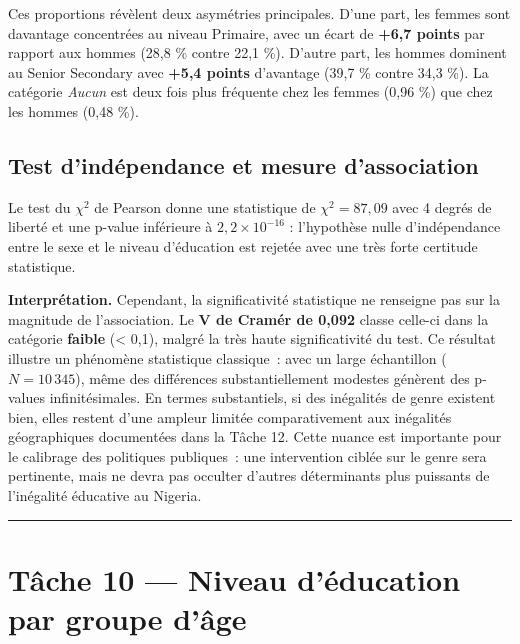\documentclass[
]{article}
\begin{document}
Ces proportions révèlent deux asymétries principales. D'une part, les
femmes sont davantage concentrées au niveau Primaire, avec un écart de
\textbf{+6,7 points} par rapport aux hommes (28,8 \% contre 22,1 \%).
D'autre part, les hommes dominent au Senior Secondary avec \textbf{+5,4
points} d'avantage (39,7 \% contre 34,3 \%). La catégorie \emph{Aucun}
est deux fois plus fréquente chez les femmes (0,96 \%) que chez les
hommes (0,48 \%).

\subsection{Test d'indépendance et mesure
d'association}\label{test-dinduxe9pendance-et-mesure-dassociation}

Le test du \(\chi^2\) de Pearson donne une statistique de
\textbf{\(\chi^2 = 87{,}09\)} avec 4 degrés de liberté et une p-value
inférieure à \(2{,}2 \times 10^{-16}\) : l'hypothèse nulle
d'indépendance entre le sexe et le niveau d'éducation est rejetée avec
une très forte certitude statistique.

\begin{interpretbox}
\textbf{Interprétation.} Cependant, la significativité statistique ne renseigne pas sur la magnitude de l'association. Le \textbf{V de Cramér de 0{,}092} classe celle-ci dans la catégorie \textbf{faible} (< 0{,}1), malgré la très haute significativité du test. Ce résultat illustre un phénomène statistique classique~: avec un large échantillon ($N = 10\,345$), même des différences substantiellement modestes génèrent des p-values infinitésimales. En termes substantiels, si des inégalités de genre existent bien, elles restent d'une ampleur limitée comparativement aux inégalités géographiques documentées dans la Tâche 12. Cette nuance est importante pour le calibrage des politiques publiques~: une intervention ciblée sur le genre sera pertinente, mais ne devra pas occulter d'autres déterminants plus puissants de l'inégalité éducative au Nigeria.
\end{interpretbox}

\begin{center}\rule{0.5\linewidth}{0.5pt}\end{center}

\section{Tâche 10 --- Niveau d'éducation par groupe
d'âge}\label{tuxe2che-10-niveau-duxe9ducation-par-groupe-duxe2ge}
\end{document}
